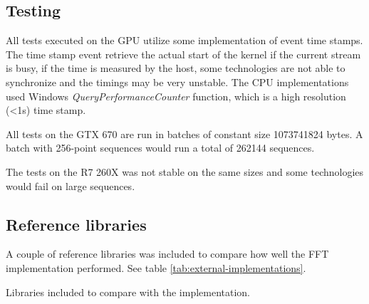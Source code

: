 \subsection{Testing}

All tests executed on the GPU utilize some implementation of event time stamps. The time stamp event retrieve the actual start of the kernel if the current stream is busy, if the time is measured by the host, some technologies are not able to synchronize and the timings may be very unstable. The CPU implementations used Windows \textit{QueryPerformanceCounter} function, which is a high resolution (<1{\micro}s) time stamp.

All tests on the GTX 670 are run in batches of constant size 1073741824 bytes. A batch with 256-point sequences would run a total of 262144 sequences.

The tests on the R7 260X was not stable on the same sizes and some technologies would fail on large sequences.

\subsection{Reference libraries}

A couple of reference libraries was included to compare how well the FFT implementation performed. See table \ref{tab:external-implementations}.

\begin{table}
	\centering
	
	\caption{Libraries included to compare with the implementation.}
	\label{tab:external-implementations}
\end{table}
